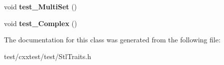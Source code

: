 \begin{DoxyCompactItemize}
\item 
\hypertarget{classStlTraits_a82a297f6ad100f45d0ad95d252731ecc}{void {\bfseries test\-\_\-\-Multi\-Set} ()}\label{classStlTraits_a82a297f6ad100f45d0ad95d252731ecc}

\item 
\hypertarget{classStlTraits_a892ca95e3f029f8da49aa62026d2425e}{void {\bfseries test\-\_\-\-Complex} ()}\label{classStlTraits_a892ca95e3f029f8da49aa62026d2425e}

\end{DoxyCompactItemize}


The documentation for this class was generated from the following file\-:\begin{DoxyCompactItemize}
\item 
test/cxxtest/test/Stl\-Traits.\-h\end{DoxyCompactItemize}
